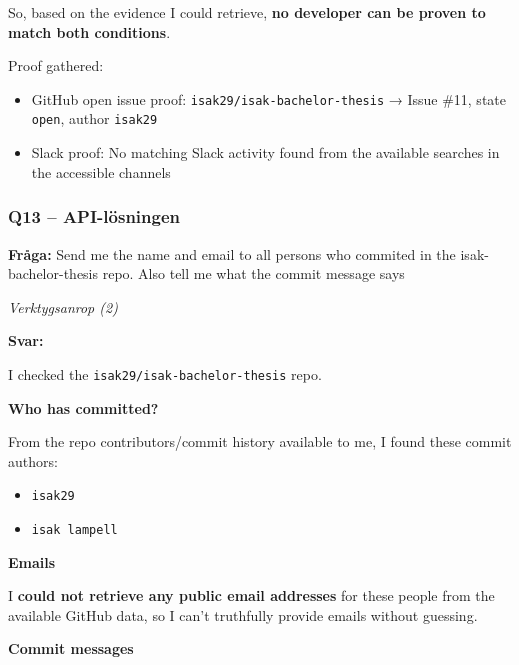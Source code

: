 So, based on the evidence I could retrieve, \textbf{no developer can be proven to match both conditions}.

Proof gathered:
\begin{itemize}
    \item GitHub open issue proof: \texttt{isak29/isak-bachelor-thesis} → Issue \#11, state \texttt{open}, author \texttt{isak29}
    \item Slack proof: No matching Slack activity found from the available searches in the accessible channels
\end{itemize}

\clearpage
\subsubsection*{Q13 -- API-lösningen}\label{fig:api_q13}

\textbf{Fråga:} Send me the name and email to all persons who commited in the isak-bachelor-thesis repo. Also tell me what the commit message says

\medskip
\textit{Verktygsanrop (2)}

\medskip
\textbf{Svar:}

I checked the \texttt{isak29/isak-bachelor-thesis} repo.

\textbf{Who has committed?}

From the repo contributors/commit history available to me, I found these commit authors:
\begin{itemize}
    \item \texttt{isak29}
    \item \texttt{isak lampell}
\end{itemize}

\textbf{Emails}

I \textbf{could not retrieve any public email addresses} for these people from the available GitHub data, so I can't truthfully provide emails without guessing.

\textbf{Commit messages}

